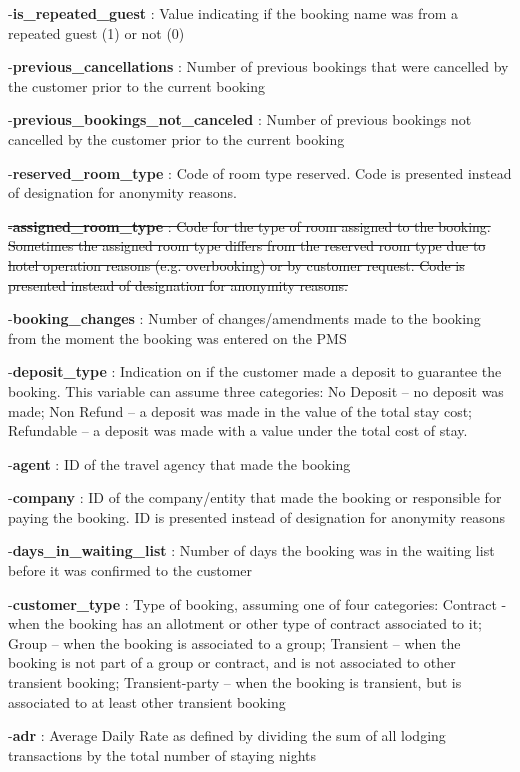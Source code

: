 \documentclass[10pt,a4paper]{article}
\theoremstyle{break}
\begin{document}
-\textbf{is\_repeated\_guest} : Value indicating if the booking name was from a repeated guest (1) or not (0)

-\textbf{previous\_cancellations} : Number of previous bookings that were cancelled by the customer prior to the current booking

-\textbf{previous\_bookings\_not\_canceled} : Number of previous bookings not cancelled by the customer prior to the current booking

-\textbf{reserved\_room\_type} : Code of room type reserved. Code is presented instead of designation for anonymity reasons.

\sout{-\textbf{assigned\_room\_type} : Code for the type of room assigned to the booking. Sometimes the assigned room type differs from the reserved room type due to hotel operation reasons (e.g. overbooking) or by customer request. Code is presented instead of designation for anonymity reasons.}

-\textbf{booking\_changes} : Number of changes/amendments made to the booking from the moment the booking was entered on the PMS

-\textbf{deposit\_type} : Indication on if the customer made a deposit to guarantee the booking. This variable can assume three categories: No Deposit -- no deposit was made; Non Refund -- a deposit was made in the value of the total stay cost; Refundable -- a deposit was made with a value under the total cost of stay.

-\textbf{agent} : ID of the travel agency that made the booking

-\textbf{company} : ID of the company/entity that made the booking or responsible for paying the booking. ID is presented instead of designation for anonymity reasons

-\textbf{days\_in\_waiting\_list} : Number of days the booking was in the waiting list before it was confirmed to the customer

-\textbf{customer\_type} : Type of booking, assuming one of four categories: Contract - when the booking has an allotment or other type of contract associated to it; Group -- when the booking is associated to a group; Transient -- when the booking is not part of a group or contract, and is not associated to other transient booking; Transient-party -- when the booking is transient, but is associated to at least other transient booking

-\textbf{adr} : Average Daily Rate as defined by dividing the sum of all lodging transactions by the total number of staying nights
\end{document}
